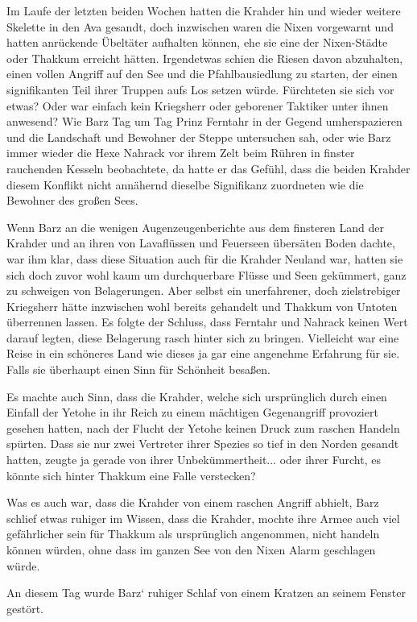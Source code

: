 Im Laufe der letzten beiden Wochen hatten die Krahder hin und wieder weitere Skelette in den Ava gesandt, doch inzwischen waren die Nixen vorgewarnt und hatten anrückende Übeltäter aufhalten können, ehe sie eine der Nixen-Städte oder Thakkum erreicht hätten. Irgendetwas schien die Riesen davon abzuhalten, einen vollen Angriff auf den See und die Pfahlbausiedlung zu starten, der einen signifikanten Teil ihrer Truppen aufs Los setzen würde. Fürchteten sie sich vor etwas? Oder war einfach kein Kriegsherr oder geborener Taktiker unter ihnen anwesend? Wie Barz Tag um Tag Prinz Ferntahr in der Gegend umherspazieren und die Landschaft und Bewohner der Steppe untersuchen sah, oder wie Barz immer wieder die Hexe Nahrack vor ihrem Zelt beim Rühren in finster rauchenden Kesseln beobachtete, da hatte er das Gefühl, dass die beiden Krahder diesem Konflikt nicht annähernd dieselbe Signifikanz zuordneten wie die Bewohner des großen Sees.

Wenn Barz an die wenigen Augenzeugenberichte aus dem finsteren Land der Krahder und an ihren von Lavaflüssen und Feuerseen übersäten Boden dachte, war ihm klar, dass diese Situation auch für die Krahder Neuland war, hatten sie sich doch zuvor wohl kaum um durchquerbare Flüsse und Seen gekümmert, ganz zu schweigen von Belagerungen. Aber selbst ein unerfahrener, doch zielstrebiger Kriegsherr hätte inzwischen wohl bereits gehandelt und Thakkum von Untoten überrennen lassen. Es folgte der Schluss, dass Ferntahr und Nahrack keinen Wert darauf legten, diese Belagerung rasch hinter sich zu bringen. Vielleicht war eine Reise in ein schöneres Land wie dieses ja gar eine angenehme Erfahrung für sie. Falls sie überhaupt einen Sinn für Schönheit besaßen.

Es machte auch Sinn, dass die Krahder, welche sich ursprünglich durch einen Einfall der Yetohe in ihr Reich zu einem mächtigen Gegenangriff provoziert gesehen hatten, nach der Flucht der Yetohe keinen Druck zum raschen Handeln spürten. Dass sie nur zwei Vertreter ihrer Spezies so tief in den Norden gesandt hatten, zeugte ja gerade von ihrer Unbekümmertheit... oder ihrer Furcht, es könnte sich hinter Thakkum eine Falle verstecken?

Was es auch war, dass die Krahder von einem raschen Angriff abhielt, Barz schlief etwas ruhiger im Wissen, dass die Krahder, mochte ihre Armee auch viel gefährlicher sein für Thakkum als ursprünglich angenommen, nicht handeln können würden, ohne dass im ganzen See von den Nixen Alarm geschlagen würde.

An diesem Tag wurde Barz‘ ruhiger Schlaf von einem Kratzen an seinem Fenster gestört.

